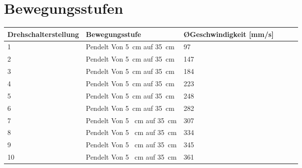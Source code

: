 %
%

\chapter{Bewegungsstufen} \label{bew}


\fontsize{8}{10}\selectfont
\begin{tabularx}{\textwidth}{|p{3cm}|X|X|X|p{1cm}|X|}
	\hline 
	\textbf{Drehschalterstellung}  & \textbf{Bewegungsstufe} & \textbf{ \O Geschwindigkeit [mm/s]}    \\ \hline
	1 & Pendelt Von 5\ cm auf 35\ cm & 97   \\
	\hline
	2 & Pendelt Von 5\ cm auf 35\ cm & 147 \\
	\hline
	3 & Pendelt Von 5\ cm auf 35\ cm & 184 \\
	\hline
	4 & Pendelt Von 5\ cm auf 35\ cm & 223 \\
	\hline
	5 & Pendelt Von 5\ cm auf 35\ cm & 248 \\
	\hline
	6 & Pendelt Von 5\ cm auf 35\ cm & 282 \\
	\hline
	7 & Pendelt Von 5 \ cm auf 35\ cm & 307 \\
	\hline
	8 & Pendelt Von 5 \ cm auf 35\ cm & 334\\
	\hline
	9 & Pendelt Von 5 \ cm auf 35\ cm & 345 \\
	\hline
	10 & Pendelt Von 5 \ cm auf 35\ cm & 361 \\
	\hline
	
	
\end{tabularx}

 \label{BewegStufTab}



